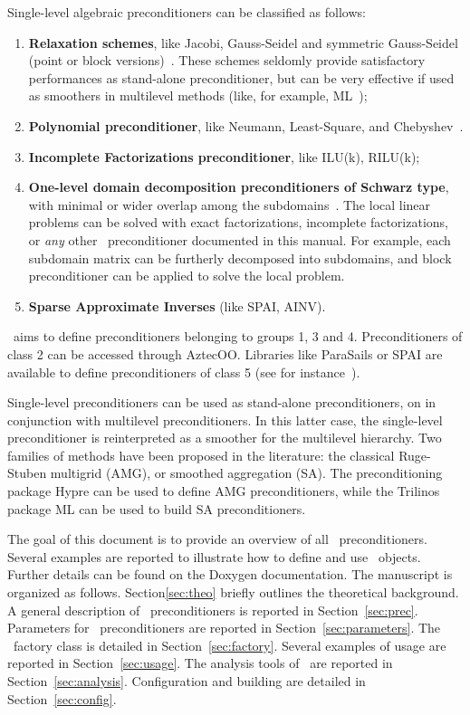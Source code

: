 Single-level algebraic preconditioners can be classified as follows:
\begin{enumerate}
\item {\bf Relaxation schemes},
  like Jacobi, Gauss-Seidel and symmetric Gauss-Seidel (point or block versions)~\cite{varga00matrix}.
  These schemes seldomly provide satisfactory performances as stand-alone
  preconditioner, but can be very effective if used as smoothers in
  multilevel methods (like, for example, ML~\cite{ml-guide});
\item {\bf Polynomial preconditioner}, like Neumann, Least-Square, and
Chebyshev~\cite{saad96iterative}.
\item {\bf Incomplete Factorizations preconditioner}, like ILU(k), RILU(k);
\item {\bf One-level domain decomposition preconditioners of Schwarz type},
  with minimal or wider overlap among the subdomains~\cite{smith96parallel,
    QV2}. The local linear problems
  can be solved with exact factorizations, incomplete factorizations, or
  {\sl any} other \ifpack\ preconditioner documented in this manual. 
  For example, each subdomain matrix
  can be furtherly decomposed into subdomains, and block preconditioner can be
  applied to solve the local problem. 
\item {\bf Sparse Approximate Inverses} (like SPAI, AINV).
\end{enumerate}
\ifpack\ aims to define preconditioners belonging to groups 1, 3 and 4.
Preconditioners of class 2 can be accessed through AztecOO. Libraries like
ParaSails or SPAI are available to define preconditioners of class 5 
(see for instance~\cite{grote97parallel,benzi98sparse}).

\begin{remark}
Single-level preconditioners can be used as stand-alone preconditioners, on in
conjunction with multilevel preconditioners. In this latter case, the
single-level preconditioner is reinterpreted as a smoother for the multilevel
hierarchy. Two families of methods have been
proposed in the literature:
the classical Ruge-Stuben multigrid (AMG), or smoothed aggregation (SA).
The preconditioning package Hypre can be used to define AMG preconditioners,
  while the Trilinos package ML can be used to build SA preconditioners.
\end{remark}

\smallskip

The goal of this document is to provide an overview of all \ifpack\
  preconditioners. Several examples are reported to illustrate how to define
  and use \ifpack\ objects. Further details can be found on the Doxygen
  documentation.
The manuscript is organized as follows. Section\ref{sec:theo} briefly outlines
the theoretical background. A general description of \ifpack\
  preconditioners is reported in Section~\ref{sec:prec}.
Parameters for \ifpack~preconditioners are reported in
Section~\ref{sec:parameters}. The \ifpack\ factory class is detailed in
Section~\ref{sec:factory}. Several examples of usage are reported in
Section~\ref{sec:usage}. The analysis tools of \ifpack\ are reported in
Section~\ref{sec:analysis}. Configuration and building are detailed in
Section~\ref{sec:config}.

